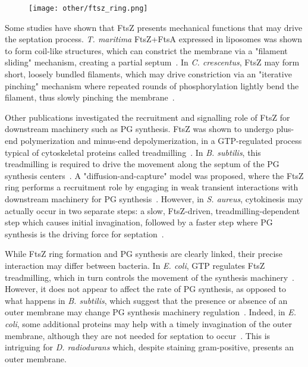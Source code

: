 \begin{figure}[ht]
    \centering
    \texttt{[image: other/ftsz\_ring.png]}
    \label{fig:ftsz_ring}
\end{figure}

Some studies have shown that FtsZ presents mechanical functions that may drive the septation process.
\textit{T. maritima} FtsZ+FtsA expressed in liposomes was shown to form coil-like structures, which can constrict the membrane via a "filament sliding" mechanism, creating a partial septum~\cite{szwedziakArchitectureRingFormed2014}.
In \textit{C. crescentus}, FtsZ may form short, loosely bundled filaments, which may drive constriction via an "iterative pinching" mechanism where repeated rounds of phosphorylation lightly bend the filament, thus slowly pinching the membrane~\cite{liStructureFtsZFilaments2007}.

Other publications investigated the recruitment and signalling role of FtsZ for downstream machinery such as PG synthesis.
FtsZ was shown to undergo plus-end polymerization and minus-end depolymerization, in a GTP-regulated process typical of cytoskeletal proteins called treadmilling~\cite{looseBacterialCellDivision2014}.
In \textit{B. subtilis}, this treadmilling is required to drive the movement along the septum of the PG synthesis centers~\cite{bisson-filhoTreadmillingFtsZFilaments2017}.
A "diffusion-and-capture" model was proposed, where the FtsZ ring performs a recruitment role by engaging in weak transient interactions with downstream machinery for PG synthesis~\cite{baranovaDiffusionCapturePermits2020}.
However, in \textit{S. aureus}, cytokinesis may actually occur in two separate steps: a slow, FtsZ-driven, treadmilling-dependent step which causes initial invagination, followed by a faster step where PG synthesis is the driving force for septation~\cite{monteiroPeptidoglycanSynthesisDrives2018}.

While FtsZ ring formation and PG synthesis are clearly linked, their precise interaction may differ between bacteria.
In \textit{E. coli}, GTP regulates FtsZ treadmilling, which in turn controls the movement of the synthesis machinery~\cite{yangGTPaseActivityCoupled2017}.
However, it does not appear to affect the rate of PG synthesis, as opposed to what happens in \textit{B. subtilis}, which suggest that the presence or absence of an outer membrane may change PG synthesis machinery regulation~\cite{yangGTPaseActivityCoupled2017}.
Indeed, in \textit{E. coli}, some additional proteins may help with a timely invagination of the outer membrane, although they are not needed for septation to occur~\cite{gerdingTransenvelopeTolPal2007}.
This is intriguing for \textit{D. radiodurans} which, despite staining gram-positive, presents an outer membrane.

